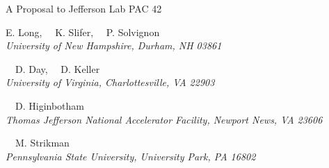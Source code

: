 \begin{center}
A Proposal to Jefferson Lab PAC 42

\vspace{1.5cm}

\setcounter{footnote}{\SPOKES}
%
{E. Long,\setcounter{footnote}{\SPOKES}
\setcounter{footnote}{\SPOKES}\footnotemark {}
\setcounter{footnote}{\CONTACT}\footnotemark{}
~~K. Slifer,\setcounter{footnote}{\SPOKES}\footnotemark
~~P. Solvignon\setcounter{footnote}{\SPOKES}\footnotemark}\\
\ls
{\normalsize\it{University of New Hampshire, Durham, NH 03861}}

\vspace{10px}

{~~D. Day,\setcounter{footnote}{\SPOKES}\footnotemark
~~D. Keller\setcounter{footnote}{\SPOKES}\footnotemark}\\
\ls
{\normalsize\it{University of Virginia, Charlottesville, VA 22903}}

\vspace{10px}

{~~D. Higinbotham\setcounter{footnote}{\SPOKES}\footnotemark}\\
\ls
{\normalsize\it{Thomas Jefferson National Accelerator Facility, Newport News, VA 23606}}

\vspace{10px}

{~~M. Strikman}\\
\ls
{\normalsize\it{Pennsylvania State University, University Park, PA 16802}}
\ks
%

\end{center}


\setcounter{footnote}{0}
